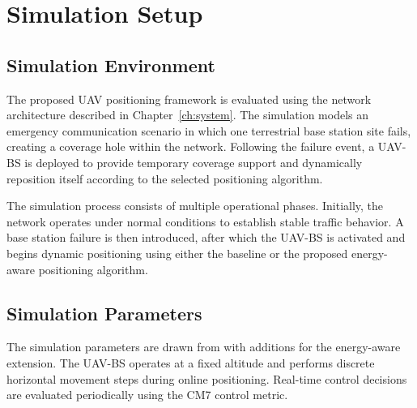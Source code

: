 \documentclass[12pt]{report}
\begin{document}
\chapter{Simulation Setup}
\label{ch:simsetup}

\section{Simulation Environment}

The proposed UAV positioning framework is evaluated using the network architecture described in Chapter~\ref{ch:system}. The simulation models an emergency communication scenario in which one terrestrial base station site fails, creating a coverage hole within the network. Following the failure event, a UAV-BS is deployed to provide temporary coverage support and dynamically reposition itself according to the selected positioning algorithm.

The simulation process consists of multiple operational phases. Initially, the network operates under normal conditions to establish stable traffic behavior. A base station failure is then introduced, after which the UAV-BS is activated and begins dynamic positioning using either the baseline or the proposed energy-aware positioning algorithm.

\section{Simulation Parameters}

The simulation parameters are drawn from \cite{pijnappel2024online} with additions for the energy-aware extension. The UAV-BS operates at a fixed altitude and performs discrete horizontal movement steps during online positioning. Real-time control decisions are evaluated periodically using the CM7 control metric.
\end{document}
